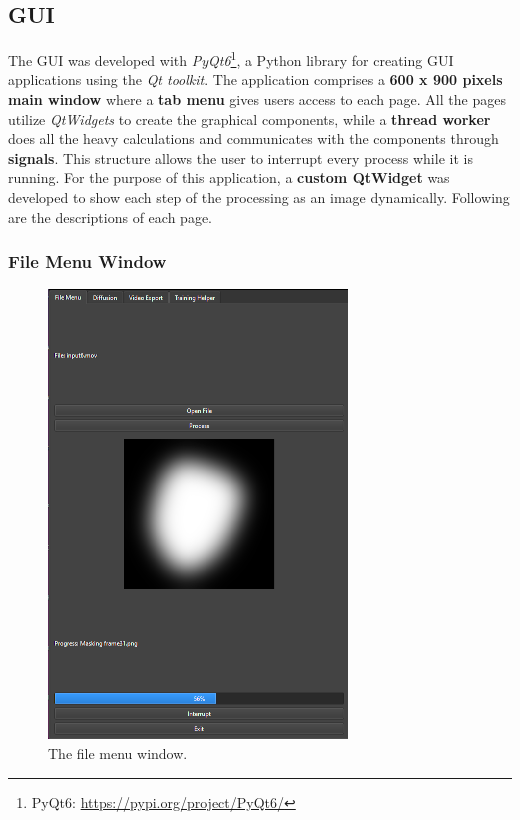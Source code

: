 \documentclass[preprint]{elsarticle}
\begin{document}
\subsection{GUI} \label{sec:gui}
The GUI was developed with \emph{PyQt6}\footnote{PyQt6: \url{https://pypi.org/project/PyQt6/}}, 
a Python library for creating GUI applications using the \emph{Qt toolkit}. 
The application comprises a \textbf{600 x 900 pixels main window} where a \textbf{tab menu} gives users access to each page.
All the pages utilize \emph{QtWidgets} to create the graphical components, 
while a \textbf{thread worker} does all the heavy calculations and communicates 
with the components through \textbf{signals}. 
This structure allows the user to interrupt every process while it is running.
For the purpose of this application, a \textbf{custom QtWidget} 
was developed to show each step of the processing as an image dynamically. 
Following are the descriptions of each page.
\subsubsection{File Menu Window}

\begin{figure}[H]
	\centering
	\includegraphics[scale=0.35, keepaspectratio]{img/project_img/file-window.png}
	\caption{The file menu window.}
	\label{fig:file-menu}
\end{figure}
\end{document}
